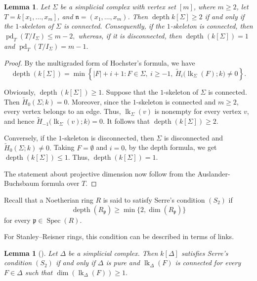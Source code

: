 \documentclass[12pt]{amsart}
\newtheorem{lemma}[proposition]{Lemma}
\DeclareMathOperator{\depth}{depth}
\DeclareMathOperator{\pd}{pd}
\DeclareMathOperator{\lk}{lk}
\DeclareMathOperator{\Spec}{Spec}
\begin{document}
\begin{lemma}\label{lem:depth-skeleton}
Let \(\Sigma\) be a simplicial complex with vertex set \([m]\), where \(m\ge2\), let \(T=k[x_1,\ldots,x_m]\), and \(\mathfrak n=(x_1,\ldots,x_m)\). Then 
\(\depth k[\Sigma]\ge2 \) if and only if the \(1\)-skeleton of \(\Sigma\) is connected. Consequently, if the \(1\)-skeleton is connected, then \(\pd_T(T/I_\Sigma)\le m-2,\) whereas, if it is disconnected, then \(\depth(k[\Sigma])=1\) and \(\pd_T(T/I_\Sigma)=m-1.\)
\end{lemma}

\begin{proof}
By the multigraded form of Hochster's formula, we have
\[
\depth(k[\Sigma])
=
\min\left\{
|F|+i+1:
F\in\Sigma,\ i\ge-1,\ 
\widetilde H_i\bigl(\lk_\Sigma(F);k\bigr)\neq0
\right\}.
\]

Obviously, \(\depth(k[\Sigma])\ge1\). Suppose that the \(1\)-skeleton of \(\Sigma\) is connected. Then $\widetilde H_0(\Sigma;k)=0.$ Moreover, since the \(1\)-skeleton is connected and \(m\ge2\), every vertex belongs to an edge. Thus, \(\lk_\Sigma(v)\) is nonempty for every vertex \(v\), and hence $\widetilde H_{-1}\bigl(\lk_\Sigma(v);k\bigr)=0.$ It follows that \(\depth (k[\Sigma])\ge2\).

Conversely, if the \(1\)-skeleton is disconnected, then \(\Sigma\) is disconnected and $\widetilde H_0(\Sigma;k)\ne0.$ Taking \(F=\emptyset\) and \(i=0\), by the depth formula, we get \(\depth(k[\Sigma]) \le1\). Thus, $\depth(k[\Sigma])=1.$

The statement about projective dimension now follow from the Auslander-Buchsbaum formula over \(T\).
\end{proof}

Recall that a Noetherian ring \(R\) is said to satisfy Serre's
condition \((S_2)\) if
\[
\depth(R_{\mathfrak p})
\ge
\min\{2,\dim(R_{\mathfrak p})\}
\]
for every \(\mathfrak p\in\Spec(R)\).

For Stanley--Reisner rings, this condition can be described in terms
of links.

\begin{lemma}[{\cite[Corollary~2.4]{PFTY}}]\label{lem:S2-links}
Let \(\Delta\) be a simplicial complex. Then \(k[\Delta]\) satisfies Serre's condition \((S_2)\) if and only if \(\Delta\) is pure and \(\lk_\Delta(F)\) is connected for every \(F\in\Delta\) such that \(\dim(\lk_\Delta(F)) \ge1.\)
\end{lemma}
\end{document}
